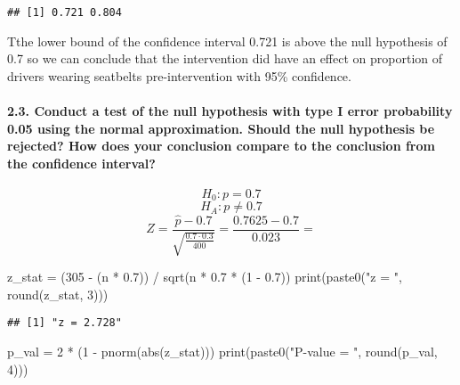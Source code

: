 \documentclass[
]{article}
\newenvironment{Shaded}{\begin{snugshade}}{\end{snugshade}}
\newcommand{\DecValTok}[1]{\textcolor[rgb]{0.00,0.00,0.81}{#1}}
\newcommand{\FloatTok}[1]{\textcolor[rgb]{0.00,0.00,0.81}{#1}}
\newcommand{\FunctionTok}[1]{\textcolor[rgb]{0.00,0.00,0.00}{#1}}
\newcommand{\NormalTok}[1]{#1}
\newcommand{\OtherTok}[1]{\textcolor[rgb]{0.56,0.35,0.01}{#1}}
\newcommand{\SpecialCharTok}[1]{\textcolor[rgb]{0.00,0.00,0.00}{#1}}
\newcommand{\StringTok}[1]{\textcolor[rgb]{0.31,0.60,0.02}{#1}}
\begin{document}
\begin{verbatim}
## [1] 0.721 0.804
\end{verbatim}

Tthe lower bound of the confidence interval 0.721 is above the null
hypothesis of 0.7 so we can conclude that the intervention did have an
effect on proportion of drivers wearing seatbelts pre-intervention with
95\% confidence.

\hypertarget{conduct-a-test-of-the-null-hypothesis-with-type-i-error-probability-0.05-using-the-normal-approximation.-should-the-null-hypothesis-be-rejected-how-does-your-conclusion-compare-to-the-conclusion-from-the-confidence-interval}{%
\paragraph{2.3. Conduct a test of the null hypothesis with type I error
probability 0.05 using the normal approximation. Should the null
hypothesis be rejected? How does your conclusion compare to the
conclusion from the confidence
interval?}\label{conduct-a-test-of-the-null-hypothesis-with-type-i-error-probability-0.05-using-the-normal-approximation.-should-the-null-hypothesis-be-rejected-how-does-your-conclusion-compare-to-the-conclusion-from-the-confidence-interval}}

\[ H_0: p = 0.7\] \[ H_A: p \neq 0.7\]
\[Z = \frac{\hat{p} - 0.7}{\sqrt{\frac{0.7 \cdot 0.3}{400}}} = \frac{0.7625 - 0.7}{0.023} = \]

\begin{Shaded}
\begin{Highlighting}[]
\NormalTok{z\_stat }\OtherTok{=}\NormalTok{ (}\DecValTok{305} \SpecialCharTok{{-}}\NormalTok{ (n }\SpecialCharTok{*} \FloatTok{0.7}\NormalTok{)) }\SpecialCharTok{/} \FunctionTok{sqrt}\NormalTok{(n }\SpecialCharTok{*} \FloatTok{0.7} \SpecialCharTok{*}\NormalTok{ (}\DecValTok{1} \SpecialCharTok{{-}} \FloatTok{0.7}\NormalTok{))}
\FunctionTok{print}\NormalTok{(}\FunctionTok{paste0}\NormalTok{(}\StringTok{"z = "}\NormalTok{, }\FunctionTok{round}\NormalTok{(z\_stat, }\DecValTok{3}\NormalTok{)))}
\end{Highlighting}
\end{Shaded}

\begin{verbatim}
## [1] "z = 2.728"
\end{verbatim}

\begin{Shaded}
\begin{Highlighting}[]
\NormalTok{p\_val }\OtherTok{=} \DecValTok{2} \SpecialCharTok{*}\NormalTok{ (}\DecValTok{1} \SpecialCharTok{{-}} \FunctionTok{pnorm}\NormalTok{(}\FunctionTok{abs}\NormalTok{(z\_stat)))}
\FunctionTok{print}\NormalTok{(}\FunctionTok{paste0}\NormalTok{(}\StringTok{"P{-}value = "}\NormalTok{, }\FunctionTok{round}\NormalTok{(p\_val, }\DecValTok{4}\NormalTok{)))}
\end{Highlighting}
\end{Shaded}
\end{document}
